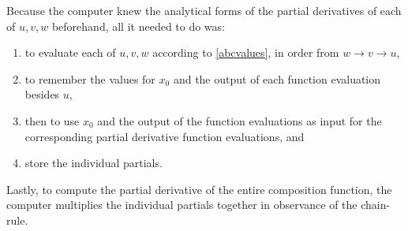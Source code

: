 \documentclass[preprint,12pt]{elsarticle}
\begin{document}
Because the computer knew the analytical forms of the partial derivatives of each of $u,v,w$ beforehand,
all it needed to do was:
\begin{enumerate}
\item to evaluate each of $u,v,w$ according to \ref{abcvalues}, in order from $w \rightarrow
v \rightarrow u$, 
\item to remember the values for $x_0$ and the output of each function evaluation besides  $u$, 
\item then to use $x_0$ and the output of the function evaluations as input for the corresponding partial
derivative function  evaluations, and
\item store the individual partials.
\end{enumerate}
Lastly, to compute the partial derivative of the entire composition function, the computer multiplies
the individual partials together in observance of the chain-rule.  
\end{document}
